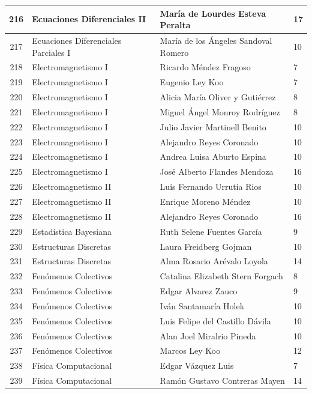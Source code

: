 {\begin{longtable}{|c|p{6.5cm}|p{5cm}|p{1.5cm}|}
216 & Ecuaciones Diferenciales II & María de Lourdes Esteva Peralta & 17 \\ \hline
217 & Ecuaciones Diferenciales Parciales I & María de los Ángeles Sandoval Romero & 10 \\ \hline
218 & Electromagnetismo I & Ricardo Méndez Fragoso & 7 \\ \hline
219 & Electromagnetismo I & Eugenio Ley Koo & 7 \\ \hline
220 & Electromagnetismo I & Alicia María Oliver y Gutiérrez & 8 \\ \hline
221 & Electromagnetismo I & Miguel Ángel Monroy Rodríguez & 8 \\ \hline
222 & Electromagnetismo I & Julio Javier Martinell Benito & 10 \\ \hline
223 & Electromagnetismo I & Alejandro Reyes Coronado & 10 \\ \hline
224 & Electromagnetismo I & Andrea Luisa Aburto Espina & 10 \\ \hline
225 & Electromagnetismo I & José Alberto Flandes Mendoza & 16 \\ \hline
226 & Electromagnetismo II & Luis Fernando Urrutia Rios & 10 \\ \hline
227 & Electromagnetismo II & Enrique Moreno Méndez & 10 \\ \hline
228 & Electromagnetismo II & Alejandro Reyes Coronado & 16 \\ \hline
229 & Estadística Bayesiana & Ruth Selene Fuentes García & 9 \\ \hline
230 & Estructuras Discretas & Laura Freidberg Gojman & 10 \\ \hline
231 & Estructuras Discretas & Alma Rosario Arévalo Loyola & 14 \\ \hline
232 & Fenómenos Colectivos & Catalina Elizabeth Stern Forgach & 8 \\ \hline
233 & Fenómenos Colectivos & Edgar Alvarez Zauco & 9 \\ \hline
234 & Fenómenos Colectivos & Iván Santamaría Holek & 10 \\ \hline
235 & Fenómenos Colectivos & Luis Felipe del Castillo Dávila & 10 \\ \hline
236 & Fenómenos Colectivos & Alan Joel Miralrio Pineda & 10 \\ \hline
237 & Fenómenos Colectivos & Marcos Ley Koo & 12 \\ \hline
238 & Física Computacional & Edgar Vázquez Luis & 7 \\ \hline
239 & Física Computacional & Ramón Gustavo Contreras Mayen & 14 \\ \hline

\end{longtable}}
